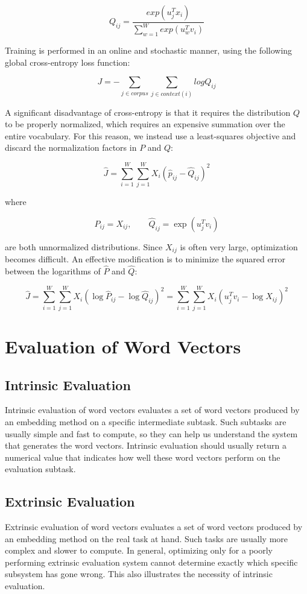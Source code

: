 \documentclass[
  a4paper,
  10pt]{article}
\begin{document}
\[
Q_{ij} = \frac{exp(u_{j}^{T}x_i)}{\sum_{w=1}^{W}exp(u_w^T v_i)}
\]

Training is performed in an online and stochastic manner, using the
following global cross-entropy loss function:

\[
J = -\sum_{j \in corpus}\sum_{j \in context(i)} logQ_{ij}
\]

A significant disadvantage of cross-entropy is that it requires the
distribution \(Q\) to be properly normalized, which requires an
expensive summation over the entire vocabulary. For this reason, we
instead use a least-squares objective and discard the normalization
factors in \(P\) and \(Q\):

\[
\hat{J}=\sum_{i=1}^{W}\sum_{j=1}^{W}X_i\left(\hat{p}_{ij}-\hat{Q}_{ij}\right)^2
\]

where

\[
\hat{P}_{ij}=X_{ij},\qquad
\hat{Q}_{ij}=\exp\left(u_j^{T}v_i\right)
\]

are both unnormalized distributions. Since \(X_{ij}\) is often very
large, optimization becomes difficult. An effective modification is to
minimize the squared error between the logarithms of \(\hat{P}\) and
\(\hat{Q}\):

\[
\hat{J}=\sum_{i=1}^{W}\sum_{j=1}^{W}X_i\left(\log\hat{P}_{ij}-\log\hat{Q}_{ij}\right)^2=\sum_{i=1}^{W}\sum_{j=1}^{W}X_i\left(u_j^{T}v_i-\log X_{ij}\right)^2
\]

\section{Evaluation of Word Vectors}\label{evaluation-of-word-vectors}

\subsection{Intrinsic Evaluation}\label{intrinsic-evaluation}

Intrinsic evaluation of word vectors evaluates a set of word vectors
produced by an embedding method on a specific intermediate subtask. Such
subtasks are usually simple and fast to compute, so they can help us
understand the system that generates the word vectors. Intrinsic
evaluation should usually return a numerical value that indicates how
well these word vectors perform on the evaluation subtask.

\subsection{Extrinsic Evaluation}\label{extrinsic-evaluation}

Extrinsic evaluation of word vectors evaluates a set of word vectors
produced by an embedding method on the real task at hand. Such tasks are
usually more complex and slower to compute. In general, optimizing only
for a poorly performing extrinsic evaluation system cannot determine
exactly which specific subsystem has gone wrong. This also illustrates
the necessity of intrinsic evaluation.
\end{document}

